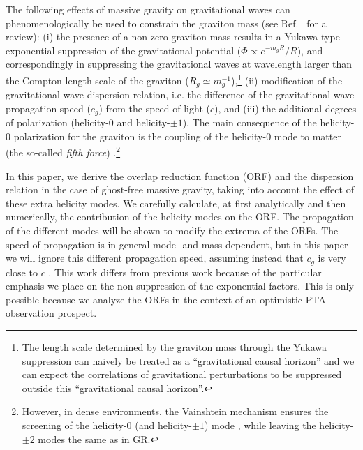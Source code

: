\documentclass[prd,aps,psfig,nofootinbib,nobibnotes,superscriptaddress,preprintnumbers,times]{revtex4-2}\setlength{\topmargin}{-14mm}
\begin{document}
The following effects of massive gravity on gravitational waves can phenomenologically be used to constrain the graviton mass (see Ref.\ \cite{deRham:2016nuf} for a review):
(i) the presence of a non-zero graviton mass results in a Yukawa-type exponential suppression of the gravitational potential ($\Phi \propto e^{-m_gR}/R$), and correspondingly in suppressing the gravitational waves at wavelength larger than the Compton length scale of the graviton ($R_g \simeq m_g^{-1}$),\footnote{The length scale determined by the graviton mass through the Yukawa suppression can naively be treated as a ``gravitational causal horizon'' and we can expect the correlations of gravitational perturbations to be suppressed outside this ``gravitational causal horizon''.}
(ii) modification of the gravitational wave dispersion relation, i.e. the difference of the gravitational wave propagation speed ($c_g$) from the speed of light ($c$), and
(iii) the additional degrees of polarization (helicity-$0$ and helicity-$\pm 1$). The main consequence of the helicity-$0$ polarization for the graviton is the coupling of the helicity-0 mode to matter (the so-called {\it fifth force}) \cite{deRham:2014naa}.\footnote{{However, in dense environments, the Vainshtein mechanism \cite{Vainshtein:1972sx} ensures the screening of the helicity-0 (and helicity-$\pm 1$) mode \cite{deRham:2012fw,
Bloomfield:2014zfa,Falck:2015rsa,Falck:2014jwa,Kase:2015zva,Koyama:2015oma}, while leaving the helicity-$\pm 2$ modes the same as in GR.}}

In this paper, we derive the overlap reduction function (ORF) and the dispersion relation in the case of ghost-free massive gravity, taking into account the effect of these extra helicity modes. We carefully calculate, at first analytically and then numerically, the contribution of the helicity modes on the ORF. The propagation of the different modes will be shown to modify the extrema of the ORFs. The speed of propagation is in general mode- and mass-dependent, but in this paper we will ignore this different propagation speed, assuming instead that $c_g$ is very close to $c$ \cite{Blas:2016qmn}. This work differs from previous work \cite{Liang:2021bct, Anholm:2008wy, Arjona:2024cex, Lee:2013awh} because of the particular emphasis we place on the non-suppression of the exponential factors. This is only possible because we analyze the ORFs in the context of an optimistic PTA observation prospect.
\end{document}
